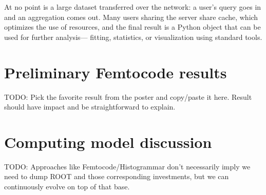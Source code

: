 \documentclass{article}
\begin{document}
At no point is a large dataset transferred over the network: a user's query goes in and an aggregation comes out. Many users sharing the server share cache, which optimizes the use of resources, and the final result is a Python object that can be used for further analysis--- fitting, statistics, or visualization using standard tools.






\section{Preliminary Femtocode results}

TODO: Pick the favorite result from the poster and copy/paste it here. Result should have impact and be straightforward to explain.

\section{Computing model discussion}

TODO: Approaches like Femtocode/Histogrammar don't necessarily imply we need to dump ROOT and those corresponding investments, but we can continuously evolve on top of that base.
\end{document}
